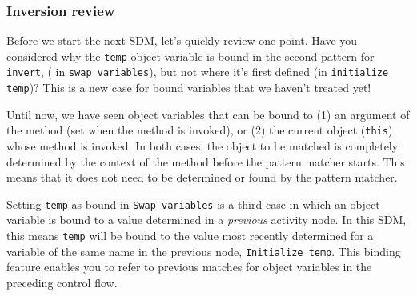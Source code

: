 \newpage
\subsubsection{Inversion review}
\genHeader
\hypertarget{invert close}{}

Before we start the next SDM, let's quickly review one point. Have you considered why the \texttt{temp} object variable is bound in the second pattern for
\texttt{invert}, ( in \texttt{swap variables}), but not where it's first defined (in \texttt{initialize temp})? This is a new case for bound variables that we
haven't treated yet!

Until now, we have seen object variables that can be bound to (1) an argument of the method (set when the method is invoked), or (2) the
current object (\texttt{this}) whose method is invoked. In both cases, the object to be matched is completely determined by the context of the method before
the pattern matcher starts. This means that it does not need to be determined or found by the pattern matcher.

Setting \texttt{temp} as bound in \texttt{Swap variables} is a third case in which an object variable is bound to a value determined in a \emph{previous}
activity node. In this SDM, this means \texttt{temp} will be bound to the value most recently determined for a variable of the same name in the previous node,
\texttt{Initialize temp}. This binding feature enables you to refer to previous matches for object variables in the preceding control flow. 
